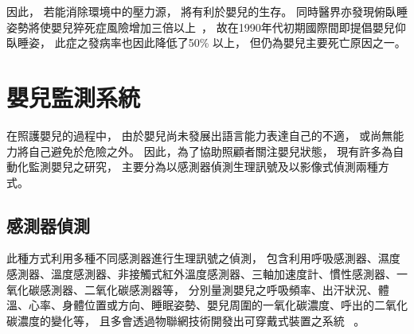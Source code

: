 \documentclass[class=NCU_thesis, crop=false]{standalone}
\begin{document}
因此，
若能消除環境中的壓力源，
將有利於嬰兒的生存。
同時醫界亦發現俯臥睡姿勢將使嬰兒猝死症風險增加三倍以上~\cite{willinger_infant_1994}，
故在1990年代初期國際間即提倡嬰兒仰臥睡姿，
此症之發病率也因此降低了50\% 以上，
但仍為嬰兒主要死亡原因之一。

\section{嬰兒監測系統}
在照護嬰兒的過程中，
由於嬰兒尚未發展出語言能力表達自己的不適，
或尚無能力將自己避免於危險之外。
因此，為了協助照顧者關注嬰兒狀態，
現有許多為自動化監測嬰兒之研究，
主要分為以感測器偵測生理訊號及以影像式偵測兩種方式。

\subsection{感測器偵測}
此種方式利用多種不同感測器進行生理訊號之偵測，
包含利用呼吸感測器、濕度感測器、溫度感測器、非接觸式紅外溫度感測器、三軸加速度計、慣性感測器、一氧化碳感測器、二氧化碳感測器等，
分別量測嬰兒之呼吸頻率、出汗狀況、體溫、心率、身體位置或方向、睡眠姿勢、嬰兒周圍的一氧化碳濃度、呼出的二氧化碳濃度的變化等，
且多會透過物聯網技術開發出可穿戴式裝置之系統
~\cite{klingeberg_mobile_2012, zhou_low_2015, bouwstra_smart_2009, malhi_zigbee-based_2012, gonzalez-valenzuela_mobility_2011, darwish_wearable_2011, ko_wireless_2010}。
\end{document}
